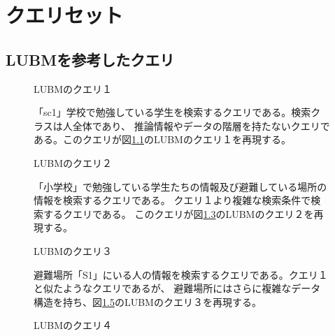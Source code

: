 ﻿\appendix
\chapter{クエリセット}\label{appendix1}

\section{LUBMを参考したクエリ}

\begin{figure}[h!]
	
	\caption{LUBMのクエリ１}
	\label{lubm_q1}
\end{figure}

\begin{figure}[h!]
	
	\caption{「sc1」学校で勉強している学生を検索するクエリである。検索クラスは人全体であり、
	推論情報やデータの階層を持たないクエリである。このクエリが図\ref{lubm_q1}のLUBMのクエリ１を再現する。}
	\label{sibm_q1}
\end{figure}

\begin{figure}[h!]
	
	\caption{LUBMのクエリ２}
	\label{lubm_q2}
\end{figure}

\begin{figure}[h!]
	
	\caption{
	「小学校」で勉強している学生たちの情報及び避難している場所の情報を検索するクエリである。
	クエリ１より複雑な検索条件で検索するクエリである。
	このクエリが図\ref{lubm_q2}のLUBMのクエリ２を再現する。}
	\label{sibm_q2}
\end{figure}

\begin{figure}[h!]
	
	\caption{LUBMのクエリ３}
	\label{lubm_q3}
\end{figure}

\begin{figure}[h!]
	
	\caption{
	避難場所「S1」にいる人の情報を検索するクエリである。クエリ１と似たようなクエリであるが、
	避難場所にはさらに複雑なデータ構造を持ち、図\ref{lubm_q3}のLUBMのクエリ３を再現する。}
	\label{sibm_q3}
\end{figure}

\begin{figure}[h!]
	
	\caption{LUBMのクエリ４}
	\label{lubm_q4}
\end{figure}

